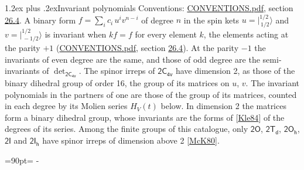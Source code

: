\documentclass[10pt,a4paper]{article}
\makeatletter
\renewcommand\section{\@startsection{section}{1}{\z@}{-3ex plus -1ex minus -.2ex}%
  {1.2ex plus .2ex}{\normalfont\large\sffamily\bfseries\color{parttitle}}}
\newcommand{\needspace}[1]{\par\penalty-100\begingroup\dimen0=#1\relax\dimen2=\pagegoal
  \advance\dimen2-\pagetotal\ifdim\dimen0>\dimen2\relax\ifdim\dimen2>0pt\vfil\break\fi\fi
  \endgroup}
\numberwithin{equation}{section}
\newcommand{\grp}[1]{\mathsf{#1}}
\newcommand{\jm}[2]{\bigl\lvert{}^{#1}_{\,#2}\bigr\rangle}
\makeatother
\begin{document}
\section{Invariant polynomials}\label{s:invariants}
Conventions: \href{../../CONVENTIONS.pdf}{CONVENTIONS.pdf}, section \href{../../CONVENTIONS.pdf\#conv.26.4}{26.4}.
\leavevmode\label{n:local.binary.form}A binary form $f = \sum_i c_i\, u^i v^{n-i}$ of degree $n$ in the spin kets $u = \jm{1/2}{1/2}$ and $v = \jm{1/2}{-1/2}$ is invariant when $k f = f$ for every element $k$, the elements acting at the parity $+1$ (\href{../../CONVENTIONS.pdf}{CONVENTIONS.pdf}, section \href{../../CONVENTIONS.pdf\#conv.26.4}{26.4}). At the parity $-1$ the invariants of even degree are the same, and those of odd degree are the semi-invariants of $\det_{\grp{2C_{4v}}}$.
The spinor irreps of $\grp{2C_{4v}}$ have dimension 2, as those of the binary dihedral group of order 16, the group of its matrices on $u$, $v$. \label{n:function.hilbert}The invariant polynomials in the partners of one are those of the group of its matrices, counted in each degree by its Molien series $H_V(t)$ below. In dimension 2 the matrices form a binary dihedral group, whose invariants are the forms of [\href{../../../REFERENCES.pdf\#ref.Kle84}{Kle84}] of the degrees of its series. Among the finite groups of this catalogue, only $\grp{2O}$, $\grp{2T_{d}}$, $\grp{2O_{h}}$, $\grp{2I}$ and $\grp{2I_{h}}$ have spinor irreps of dimension above 2 [\href{../../../REFERENCES.pdf\#ref.McK80}{McK80}].
\needspace{90pt}
\end{document}
